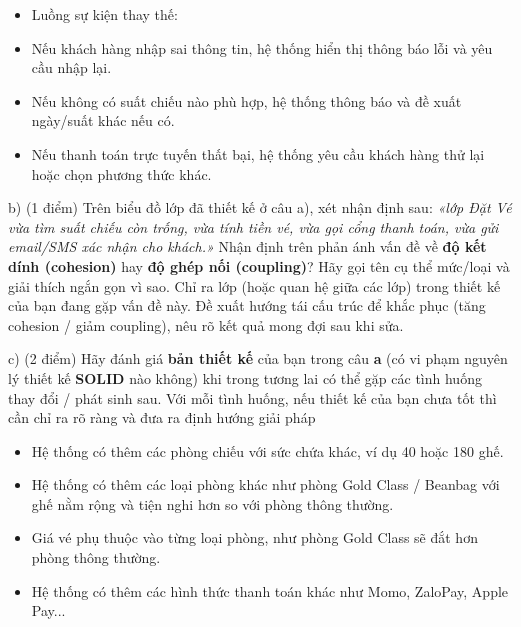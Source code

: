 \documentclass[11pt,a4paper]{article}
\begin{document}
\par\nobreak\vspace*{0pt}
{\itshape\nobreak
\begin{itemize}[leftmargin=1.05cm,itemsep=0pt,topsep=1pt,parsep=0pt]
\item[]\nobreak
Luồng sự kiện thay thế:
  \item Nếu khách hàng nhập sai thông tin, hệ thống hiển thị thông báo lỗi và yêu cầu nhập lại.
  \item Nếu không có suất chiếu nào phù hợp, hệ thống thông báo và đề xuất ngày/suất khác nếu có.
  \item Nếu thanh toán trực tuyến thất bại, hệ thống yêu cầu khách hàng thử lại hoặc chọn phương thức khác.\par
\end{itemize}
}

\par\vspace{3pt}
\noindent b) (1 điểm) Trên biểu đồ lớp đã thiết kế ở câu a), xét nhận định sau: \textit{«lớp Đặt Vé vừa tìm suất chiếu còn trống, vừa tính tiền vé, vừa gọi cổng thanh toán, vừa gửi email/SMS xác nhận cho khách.»} Nhận định trên phản ánh vấn đề về \textbf{độ kết dính (cohesion)} hay \textbf{độ ghép nối (coupling)}? Hãy gọi tên cụ thể mức/loại và giải thích ngắn gọn vì sao. Chỉ ra lớp (hoặc quan hệ giữa các lớp) trong thiết kế của bạn đang gặp vấn đề này. Đề xuất hướng tái cấu trúc để khắc phục (tăng cohesion / giảm coupling), nêu rõ kết quả mong đợi sau khi sửa.

\par\vspace{3pt}
\noindent c) (2 điểm) Hãy đánh giá \textbf{bản thiết kế} của bạn trong câu \textbf{a} (có vi phạm nguyên lý thiết kế \textbf{SOLID} nào không) khi trong tương lai có thể gặp các tình huống thay đổi / phát sinh sau. Với mỗi tình huống, nếu thiết kế của bạn chưa tốt thì cần chỉ ra rõ ràng và đưa ra định hướng giải pháp
\vspace{-1pt}
\begin{itemize}[leftmargin=1.05cm,itemsep=0pt,topsep=0pt,parsep=0pt]
  \item Hệ thống có thêm các phòng chiếu với sức chứa khác, ví dụ 40 hoặc 180 ghế.
  \item Hệ thống có thêm các loại phòng khác như phòng Gold Class / Beanbag với ghế nằm rộng và tiện nghi hơn so với phòng thông thường.
  \item Giá vé phụ thuộc vào từng loại phòng, như phòng Gold Class sẽ đắt hơn phòng thông thường.
  \item Hệ thống có thêm các hình thức thanh toán khác như Momo, ZaloPay, Apple Pay...\par
\end{itemize}
\end{document}
